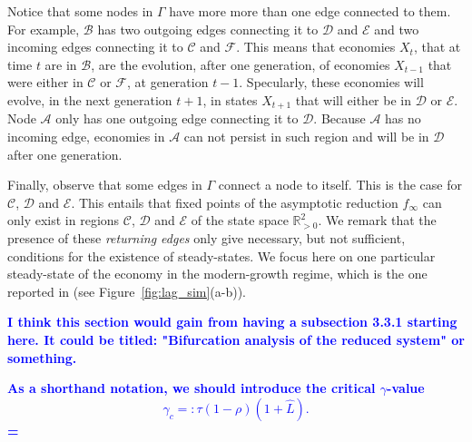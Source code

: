 \documentclass[a4paper,fleqn]{cas-sc}
\newcommand{\samb}[1]{\textcolor{blue}{\textbf{#1}}}
\begin{document}
Notice that some nodes in $\Gamma$ have more more than one edge connected to them.
For example, $\mathcal B$ has two outgoing edges connecting it to $\mathcal D$ and $\mathcal E$ and two incoming edges connecting it to $\mathcal C$ and $\mathcal F$.
This means that economies $X_t$, that at time $t$ are in $\mathcal B$, are the evolution, after one generation, of economies $X_{t-1}$ that were either in $\mathcal C$ or $\mathcal F$, at generation $t-1$.
Specularly, these economies will evolve, in the next generation $t+1$, in states $X_{t+1}$ that will either be in $\mathcal D$ or $\mathcal E$.
Node $\mathcal A$ only has one outgoing edge connecting it to $\mathcal D$.
Because $\mathcal A$ has no incoming edge, economies in $\mathcal A$ can not persist in such region and will be in $\mathcal D$ after one generation.

Finally, observe that some edges in $\Gamma$ connect a node to itself.
This is the case for $\mathcal C$, $\mathcal D$ and $\mathcal E$.
This entails that fixed points of the asymptotic reduction $f_{\infty}$ can only exist in regions $\mathcal{C}$, $\mathcal{D}$ and $\mathcal{E}$ of the state space $\mathbb{R}^2_{>0}$.
We remark that the presence of these \emph{returning edges} only give necessary, but not sufficient, conditions for the existence of steady-states.
We focus here on one particular steady-state of the economy in the modern-growth regime, which is the one reported in \cite{Lagerlof2006} (see Figure~\ref{fig:lag_sim}(a-b)).
%

\samb{I think this section would gain from having a subsection 3.3.1 starting here. It could be titled: "Bifurcation analysis of the reduced system" or something.}

\samb{As a shorthand notation, we should introduce the critical $\gamma$-value 
\begin{equation}
\label{eq:gammac}
    \gamma_c=:\tau(1-\rho)(1+\hat{L}).
\end{equation}
=
}
\end{document}
